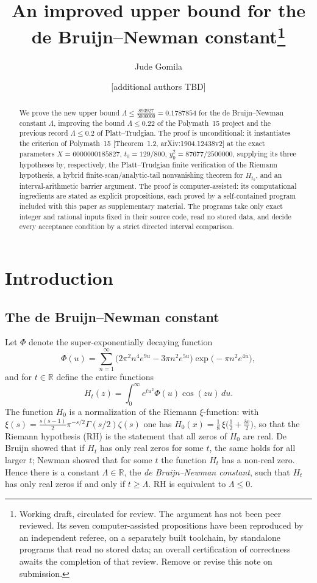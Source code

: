 \documentclass[11pt]{article}
\title{An improved upper bound for the de Bruijn--Newman
constant\thanks{Working draft, circulated for review. The argument
has not been peer reviewed. Its seven computer-assisted
propositions have been reproduced by an independent referee, on a
separately built toolchain, by standalone programs that read no
stored data; an overall certification of correctness awaits the
completion of that review. Remove or revise this note on
submission.}}
\author{Jude Gomila \and [additional authors TBD]}
\date{}
\theoremstyle{definition}
\newcommand{\LB}{\Lambda}
\newcommand{\R}{\mathbb{R}}
\begin{document}
\maketitle

\begin{abstract}
We prove the new upper bound
$\LB\le\frac{893927}{5000000}=0.1787854$
for the de Bruijn--Newman constant $\LB$, improving the bound
$\LB\le0.22$ of the Polymath~15 project and the previous record
$\LB\le0.2$ of Platt--Trudgian. The proof is unconditional: it
instantiates the criterion of Polymath~15 [Theorem~1.2,
arXiv:1904.12438v2] at the exact parameters $X=6000000185827$,
$t_0=129/800$, $y_0^2=87677/2500000$, supplying its three
hypotheses by, respectively, the Platt--Trudgian finite
verification of the Riemann hypothesis, a hybrid
finite-scan/analytic-tail nonvanishing theorem for $H_{t_0}$, and
an interval-arithmetic barrier argument. The proof is
computer-assisted: its computational ingredients are stated as
explicit propositions, each proved by a self-contained program
included with this paper as supplementary material. The programs
take only exact integer and rational inputs fixed in their source
code, read no stored data, and decide every acceptance condition
by a strict directed interval comparison.
\end{abstract}

\tableofcontents

\section{Introduction}

\subsection{The de Bruijn--Newman constant}

Let $\Phi$ denote the super-exponentially decaying function
\[
\Phi(u)=\sum_{n=1}^{\infty}
\bigl(2\pi^2n^4e^{9u}-3\pi n^2e^{5u}\bigr)
\exp\!\bigl(-\pi n^2e^{4u}\bigr),
\]
and for $t\in\R$ define the entire functions
\begin{equation}\label{eq:Ht}
H_t(z)=\int_0^\infty e^{tu^2}\Phi(u)\cos(zu)\,du .
\end{equation}
The function $H_0$ is a normalization of the Riemann $\xi$-function:
with $\xi(s)=\frac{s(s-1)}{2}\pi^{-s/2}\Gamma(s/2)\zeta(s)$ one has
$H_0(x)=\frac18\,\xi\!\bigl(\frac12+\frac{ix}2\bigr)$, so that the
Riemann hypothesis (RH) is the statement that all zeros of $H_0$ are
real. De Bruijn \cite{deBruijn} showed that if $H_t$ has only real
zeros for some $t$, the same holds for all larger $t$; Newman
\cite{Newman} showed that for some $t$ the function $H_t$ has a
non-real zero. Hence there is a constant $\LB\in\R$, the
\emph{de Bruijn--Newman constant}, such that $H_t$ has only real zeros
if and only if $t\ge\LB$. RH is equivalent to $\LB\le0$.
\end{document}
